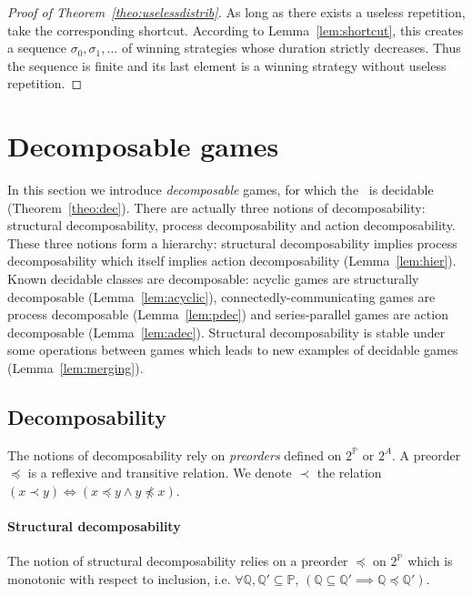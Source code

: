 \documentclass[a4paper,UKenglish]{lipics-v2016}
\newcommand{\PP}{\mathbb{P}}
\newcommand{\QQ}{\mathbb{Q}}
\begin{document}
\begin{proof}[Proof of Theorem~\ref{theo:uselessdistrib}]
As long as there exists a useless repetition,
take the corresponding shortcut.
According to Lemma~\ref{lem:shortcut},
this creates a sequence $\sigma_0,\sigma_1,\ldots$
of winning strategies whose duration strictly decreases. Thus the sequence is finite and its last element
is a winning strategy without useless repetition.
\end{proof}



\section{Decomposable games}
\label{sec:decomposable}

In this section we introduce \emph{decomposable} games,
for which the \dsp\ is decidable (Theorem~\ref{theo:dec}).
There are actually three notions of decomposability:
structural decomposability, process decomposability and action decomposability.
These three notions form a hierarchy:
structural decomposability implies process decomposability which itself implies action decomposability (Lemma~\ref{lem:hier}).
Known decidable classes are decomposable:
acyclic games are structurally decomposable (Lemma~\ref{lem:acyclic}),
connectedly-communicating games are process decomposable (Lemma~\ref{lem:pdec})
and series-parallel games are action decomposable
(Lemma~\ref{lem:adec}).
Structural decomposability is stable under some  operations between games which leads to new examples
of decidable games (Lemma~\ref{lem:merging}).

\subsection{Decomposability}



The notions of decomposability rely on \emph{preorders} defined on $2^\PP$ or $2^A$. A preorder $\preceq$ is a reflexive and transitive relation.
We denote $\prec$ the relation $(x \prec y) \iff (x \preceq y \land y \not\preceq x)$.
 
\paragraph*{Structural decomposability}
The notion of structural decomposability relies on a preorder
$\preceq$ on $2^\PP$ 
which is 
monotonic with respect to inclusion, i.e. $\forall \QQ,\QQ'\subseteq \PP$,
$
(\QQ \subseteq \QQ' \implies \QQ \preceq \QQ')
$.
\end{document}
